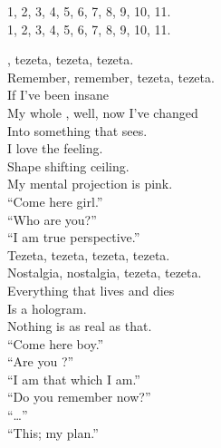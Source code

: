 


1, 2, 3, 4, 5, 6, 7, 8, 9, 10, 11. \\
1, 2, 3, 4, 5, 6, 7, 8, 9, 10, 11. \\




, tezeta, tezeta, tezeta. \\
Remember, remember, tezeta, tezeta. \\

If I've been insane \\
My whole , well, now I've changed \\
Into something that sees. \\
I love the feeling. \\
Shape shifting ceiling. \\
My mental projection is pink. \\

``Come here girl.'' \\
``Who are you?'' \\
``I am true perspective.'' \\

Tezeta, tezeta, tezeta, tezeta. \\
Nostalgia, nostalgia, tezeta, tezeta. \\

Everything that lives and dies \\
Is a hologram. \\
Nothing is as real as that. \\
``Come here boy.'' \\
``Are you ?'' \\
``I am that which I am.'' \\

``Do you remember now?'' \\
``…'' \\
``This; my  plan.'' \\



